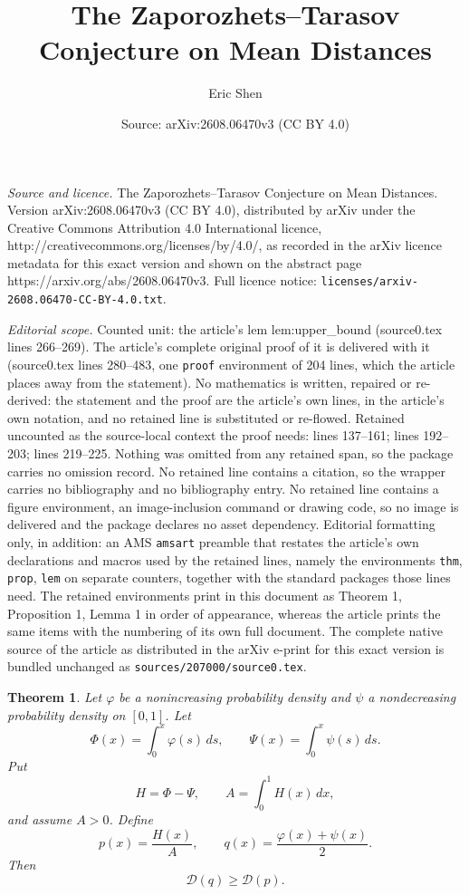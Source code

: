 \documentclass[10pt,a4paper]{amsart}
\title{The Zaporozhets–Tarasov Conjecture on Mean Distances}
\author{Eric Shen}
\date{Source: arXiv:2608.06470v3 (CC BY 4.0)}
\newtheorem{thm}{Theorem}
\newcommand{\Gini}{\mathcal D}
\begin{document}
\maketitle

\noindent\emph{Source and licence.} The Zaporozhets–Tarasov Conjecture on Mean Distances. Version arXiv:2608.06470v3 (CC BY 4.0), distributed by arXiv under the Creative Commons Attribution 4.0 International licence, http://creativecommons.org/licenses/by/4.0/, as recorded in the arXiv licence metadata for this exact version and shown on the abstract page https://arxiv.org/abs/2608.06470v3. Full licence notice: \texttt{licenses/arxiv-2608.06470-CC-BY-4.0.txt}.\par\smallskip

\noindent\textit{Editorial scope.} Counted unit: the article's lem lem:upper\_bound (source0.tex lines 266--269). The article's complete original proof of it is delivered with it (source0.tex lines 280--483, one \texttt{proof} environment of 204 lines, which the article places away from the statement). No mathematics is written, repaired or re-derived: the statement and the proof are the article's own lines, in the article's own notation, and no retained line is substituted or re-flowed.  Retained uncounted as the source-local context the proof needs: lines 137--161; lines 192--203; lines 219--225.  Nothing was omitted from any retained span, so the package carries no omission record.  No retained line contains a citation, so the wrapper carries no bibliography and no bibliography entry.  No retained line contains a figure environment, an image-inclusion command or drawing code, so no image is delivered and the package declares no asset dependency.  Editorial formatting only, in addition: an AMS \texttt{amsart} preamble that restates the article's own declarations and macros used by the retained lines, namely the environments \texttt{thm}, \texttt{prop}, \texttt{lem} on separate counters, together with the standard packages those lines need.  The retained environments print in this document as Theorem 1, Proposition 1, Lemma 1 in order of appearance, whereas the article prints the same items with the numbering of its own full document.  The complete native source of the article as distributed in the arXiv e-print for this exact version is bundled unchanged as \texttt{sources/207000/source0.tex}.
\begin{thm}
    \label{thm:endpoint}
Let $\varphi$ be a nonincreasing probability density and $\psi$ a nondecreasing probability density on $[0,1]$. Let
$$
 \Phi(x)=\int_0^x\varphi(s)\,ds,
 \qquad
 \Psi(x)=\int_0^x\psi(s)\,ds.
$$
Put
$$
 H=\Phi-\Psi,
 \qquad
 A=\int_0^1H(x)\,dx,
$$
and assume $A>0$. Define
$$
 p(x)=\frac{H(x)}A,
 \qquad
 q(x)=\frac{\varphi(x)+\psi(x)}2.
$$
Then
$$
 \Gini(q)\ge \Gini(p).
$$
\end{thm}
\end{document}
